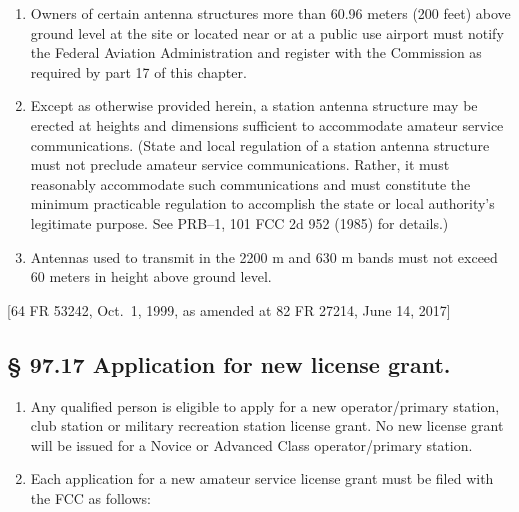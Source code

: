 \documentclass[
  letterpaper,
  DIV=11,
  numbers=noendperiod]{scrreport}
\begin{document}
\begin{enumerate}
\def\labelenumi{(\alph{enumi})}
\item
  Owners of certain antenna structures more than 60.96 meters (200 feet)
  above ground level at the site or located near or at a public use
  airport must notify the Federal Aviation Administration and register
  with the Commission as required by part 17 of this chapter.
\item
  Except as otherwise provided herein, a station antenna structure may
  be erected at heights and dimensions sufficient to accommodate amateur
  service communications. (State and local regulation of a station
  antenna structure must not preclude amateur service communications.
  Rather, it must reasonably accommodate such communications and must
  constitute the minimum practicable regulation to accomplish the state
  or local authority's legitimate purpose. See PRB--1, 101 FCC 2d 952
  (1985) for details.)
\item
  Antennas used to transmit in the 2200 m and 630 m bands must not
  exceed 60 meters in height above ground level.
\end{enumerate}

{[}64 FR 53242, Oct.~1, 1999, as amended at 82 FR 27214, June 14,
2017{]}

\hypertarget{97.17}{%
\subsection*{§ 97.17 Application for new license grant.}\label{97.17}}

\begin{enumerate}
\def\labelenumi{(\alph{enumi})}
\item
  Any qualified person is eligible to apply for a new operator/primary
  station, club station or military recreation station license grant. No
  new license grant will be issued for a Novice or Advanced Class
  operator/primary station.
\item
  Each application for a new amateur service license grant must be filed
  with the FCC as follows:
\end{enumerate}
\end{document}
